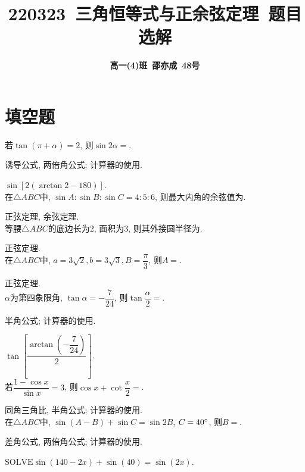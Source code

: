 \documentclass[8pt]{article}
\author{\normalfont\sffamily\large\bfseries{高一(4)班\ 邵亦成\ 48号}}
\title{\normalfont\sffamily\huge\bfseries{\textcolor{allanblue}{220323}\ \textcolor{allancyan}{三角恒等式与正余弦定理}\ 题目选解}}
\date{}
\begin{document}
	\maketitle

	\section{填空题}
		若$\tan \left(\pi + \alpha \right)=2$, 则$\sin 2\alpha=$.

		诱导公式, 两倍角公式; 计算器的使用.

		$\sin\left[2\left(\arctan 2 - 180\right)\right]$.
		~\\

		在$\triangle ABC$中, $\sin A : \sin B : \sin C = 4:5:6$, 则最大内角的余弦值为.

		正弦定理, 余弦定理.
		~\\

		等腰$\triangle ABC$的底边长为$2$, 面积为$3$, 则其外接圆半径为.

		正弦定理.
		~\\

		在$\triangle ABC$中, $a=3\sqrt{2}, b=3\sqrt{3}, B=\dfrac{\pi}{3}$, 则$A=$.

		正弦定理.
		~\\

		 $\alpha$为第四象限角, $\tan \alpha = -\dfrac{7}{24}$, 则$\tan \dfrac{\alpha}{2}=$.

		半角公式; 计算器的使用.

		$\tan \left[\dfrac{\arctan \left(-\dfrac{7}{24}\right)}{2}\right]$.
		~\\

		 若$\dfrac{1-\cos x}{\sin x}=3$, 则$\cos x + \cot \dfrac{x}{2}=$.

		同角三角比, 半角公式; 计算器的使用.
		~\\

		 在$\triangle ABC$中, $\sin (A-B) + \sin C=\sin 2B$, $C=40^\circ$, 则$B=$\answord{$70\degree \lgor 90\degree$}.

		差角公式, 两倍角公式; 计算器的使用.

		$\mathrm{SOLVE} \sin(140-2x)+\sin(40)=\sin(2x)$.
		~\\
\end{document}
